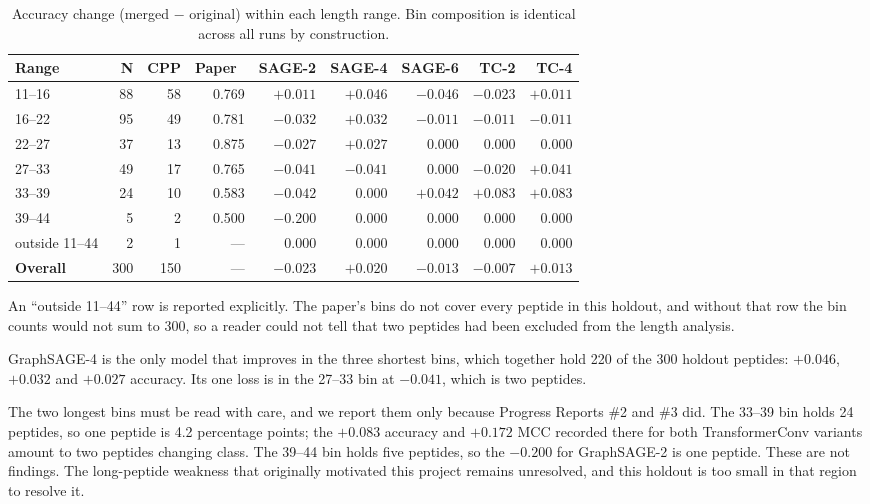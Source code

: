 \documentclass[11pt,a4paper]{article}
\newcommand{\up}[1]{\textcolor{tealx}{#1}}
\newcommand{\dn}[1]{\textcolor{downr}{#1}}
\begin{document}
\begin{table}[h]
\centering\footnotesize
\setlength{\tabcolsep}{5pt}
\begin{tabular}{@{}lrrrrrrrr@{}}
\toprule
\sffamily\bfseries\color{navy}Range & \sffamily\bfseries\color{navy}N & \sffamily\bfseries\color{navy}CPP &
\sffamily\bfseries\color{navy}Paper~\cite{graphcpp} & \sffamily\bfseries\color{navy}SAGE-2 &
\sffamily\bfseries\color{navy}SAGE-4 & \sffamily\bfseries\color{navy}SAGE-6 &
\sffamily\bfseries\color{navy}TC-2 & \sffamily\bfseries\color{navy}TC-4\\
\midrule
11--16 & 88 & 58 & 0.769 & \up{$+0.011$} & \up{$+0.046$} & \dn{$-0.046$} & \dn{$-0.023$} & \up{$+0.011$}\\
16--22 & 95 & 49 & 0.781 & \dn{$-0.032$} & \up{$+0.032$} & \dn{$-0.011$} & \dn{$-0.011$} & \dn{$-0.011$}\\
22--27 & 37 & 13 & 0.875 & \dn{$-0.027$} & \up{$+0.027$} & $0.000$ & $0.000$ & $0.000$\\
27--33 & 49 & 17 & 0.765 & \dn{$-0.041$} & \dn{$-0.041$} & $0.000$ & \dn{$-0.020$} & \up{$+0.041$}\\
33--39 & 24 & 10 & 0.583 & \dn{$-0.042$} & $0.000$ & \up{$+0.042$} & \up{$+0.083$} & \up{$+0.083$}\\
39--44 &  5 &  2 & 0.500 & \dn{$-0.200$} & $0.000$ & $0.000$ & $0.000$ & $0.000$\\
outside 11--44 & 2 & 1 & --- & $0.000$ & $0.000$ & $0.000$ & $0.000$ & $0.000$\\
\midrule
\textbf{Overall} & 300 & 150 & --- & \dn{$-0.023$} & \up{$+0.020$} & \dn{$-0.013$} & \dn{$-0.007$} & \up{$+0.013$}\\
\bottomrule
\end{tabular}
\caption{Accuracy change (merged $-$ original) within each length range. Bin composition is identical
across all runs by construction.}
\end{table}

An ``outside 11--44'' row is reported explicitly. The paper's bins do not cover every peptide in this
holdout, and without that row the bin counts would not sum to 300, so a reader could not tell that two
peptides had been excluded from the length analysis.

GraphSAGE-4 is the only model that improves in the three shortest bins, which together hold 220 of the
300 holdout peptides: $+0.046$, $+0.032$ and $+0.027$ accuracy. Its one loss is in the 27--33 bin at
$-0.041$, which is two peptides.

The two longest bins must be read with care, and we report them only because Progress Reports \#2 and \#3
did. The 33--39 bin holds 24 peptides, so one peptide is 4.2 percentage points; the $+0.083$ accuracy and
$+0.172$ MCC recorded there for both TransformerConv variants amount to two peptides changing class. The
39--44 bin holds five peptides, so the $-0.200$ for GraphSAGE-2 is one peptide. These are not findings.
The long-peptide weakness that originally motivated this project remains unresolved, and this holdout is
too small in that region to resolve it.
\end{document}
